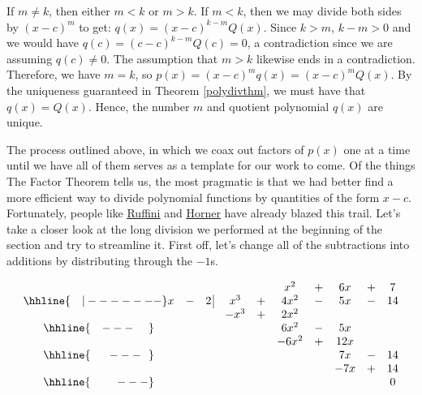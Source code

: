 \documentclass{ximera}
\begin{document}
\medskip

If $m \neq k$, then either $m<k$ or $m>k$.  If $m<k$, then we may divide both sides by $(x-c)^{m}$ to get: $q(x) = (x-c)^{k-m} Q(x)$.  Since $k>m$, $k-m>0$ and we would have $q(c) = (c-c)^{k-m} Q(c) = 0$, a contradiction since we are assuming $q(c) \neq 0$.   The assumption that $m>k$ likewise ends in a contradiction.   Therefore, we have $m = k$, so $p(x) = (x-c)^m q(x) = (x-c)^m Q(x)$.  By the uniqueness guaranteed in Theorem \ref{polydivthm}, we must have that $q(x) = Q(x)$.  Hence, the number $m$ and quotient polynomial $q(x)$ are unique. 

\medskip

The process outlined above, in which we coax out factors of $p(x)$ one at a time until we have all of them serves as a template for our work to come. Of the things The Factor Theorem tells us, the most pragmatic is that we had better find a more efficient way to divide polynomial functions by quantities of the form $x-c$.  Fortunately, people like \href{http://en.wikipedia.org/wiki/Synthetic_division}{\underline{Ruffini}} and \href{http://en.wikipedia.org/wiki/Horner_scheme}{\underline{Horner}} have already blazed this trail.  Let's take a closer look at the long division we performed at the beginning of the section and try to streamline it.  First off, let's change all of the subtractions into additions by distributing through the $-1$s.


\setlength\arraycolsep{0.1pt}
\setlength\extrarowheight{2pt}

\[ \begin{array}{cccccccccc}

& & & & & x^2 & + & 6x & + & 7 \\ \hhline{~~~|-------}

x & - & 2 \, \vline& x^3 & + & 4x^2 & - & 5x & - & 14 \\

 &  &  &  -x^3  & + &   2x^2 &  &  &  &  \\ \hhline{~~~---~~~~} 
 &  &  &   &  & 6 x^2 & - & 5x &  &  \\ 
 &  &  &   & &-6 x^2  & + &  12x &  &  \\ \hhline{~~~~~---~~} 
 &  &  &   &   &  & & 7x  & - & 14 \\
 &  &  &   &   &  & & - 7x  & + &  14  \\ \hhline{~~~~~~~---} 
 &   &  &  &  &  &  &  &  & 0
 
\end{array}\]
\end{document}

